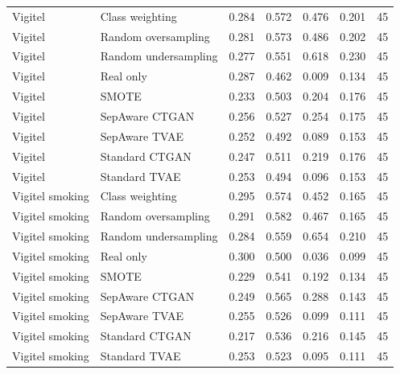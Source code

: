 \begin{longtable}{p{}p{}rrrrr}
Vigitel & Class weighting & 0.284 & 0.572 & 0.476 & 0.201 & 45 \\
Vigitel & Random oversampling & 0.281 & 0.573 & 0.486 & 0.202 & 45 \\
Vigitel & Random undersampling & 0.277 & 0.551 & 0.618 & 0.230 & 45 \\
Vigitel & Real only & 0.287 & 0.462 & 0.009 & 0.134 & 45 \\
Vigitel & SMOTE & 0.233 & 0.503 & 0.204 & 0.176 & 45 \\
Vigitel & SepAware CTGAN & 0.256 & 0.527 & 0.254 & 0.175 & 45 \\
Vigitel & SepAware TVAE & 0.252 & 0.492 & 0.089 & 0.153 & 45 \\
Vigitel & Standard CTGAN & 0.247 & 0.511 & 0.219 & 0.176 & 45 \\
Vigitel & Standard TVAE & 0.253 & 0.494 & 0.096 & 0.153 & 45 \\
Vigitel smoking & Class weighting & 0.295 & 0.574 & 0.452 & 0.165 & 45 \\
Vigitel smoking & Random oversampling & 0.291 & 0.582 & 0.467 & 0.165 & 45 \\
Vigitel smoking & Random undersampling & 0.284 & 0.559 & 0.654 & 0.210 & 45 \\
Vigitel smoking & Real only & 0.300 & 0.500 & 0.036 & 0.099 & 45 \\
Vigitel smoking & SMOTE & 0.229 & 0.541 & 0.192 & 0.134 & 45 \\
Vigitel smoking & SepAware CTGAN & 0.249 & 0.565 & 0.288 & 0.143 & 45 \\
Vigitel smoking & SepAware TVAE & 0.255 & 0.526 & 0.099 & 0.111 & 45 \\
Vigitel smoking & Standard CTGAN & 0.217 & 0.536 & 0.216 & 0.145 & 45 \\
Vigitel smoking & Standard TVAE & 0.253 & 0.523 & 0.095 & 0.111 & 45 \\
\bottomrule
\end{longtable}
